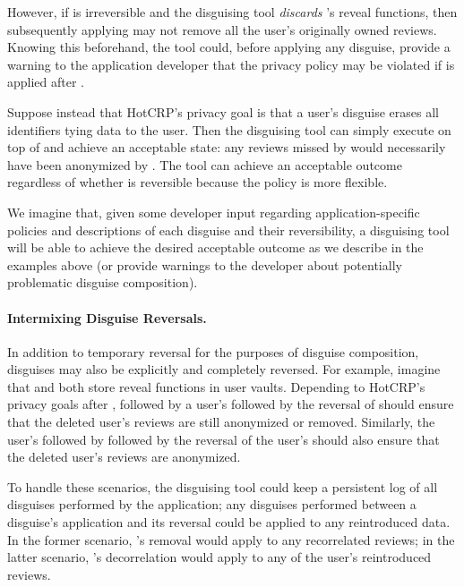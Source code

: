 However, if \ca is irreversible and the disguising tool \emph{discards} \ca's reveal functions, then
subsequently applying \gdpr may not remove all the user's originally owned reviews. Knowing this
beforehand, the tool could,
before applying any disguise, provide a warning to the application developer that the privacy policy may be violated if \gdpr is
applied after \ca.

Suppose instead that HotCRP's privacy goal is that a user's \gdpr disguise erases all identifiers
tying data to the user.
Then the disguising tool can simply execute \gdpr on top of
\ca and achieve an acceptable state: any reviews missed by \gdpr would necessarily have been
anonymized by \ca.  The tool can achieve an acceptable outcome regardless of whether \ca is
reversible because the policy is more flexible.

We imagine that, given some developer input regarding application-specific policies and descriptions
of each disguise and their reversibility, a disguising tool will be able to achieve the desired acceptable
outcome as we describe in the examples above (or provide warnings to the developer about potentially
problematic disguise composition).

\paragraph{Intermixing Disguise Reversals.}
In addition to temporary reversal for the purposes of disguise composition, disguises may also be
explicitly and completely reversed. 
For example, imagine that \ca and \gdpr both store reveal functions in user vaults. 
%
Depending to HotCRP's privacy goals after \gdpr, \ca followed by a user's \gdpr followed by the
reversal of \ca should ensure that the deleted user's reviews are still anonymized or removed.
Similarly, the user's \gdpr followed by \ca followed by the reversal of the user's \gdpr should also
ensure that the deleted user's reviews are anonymized.

To handle these scenarios, the disguising tool could keep a persistent log of all disguises
performed by the application; any disguises performed between a disguise's application and its
reversal could be applied to any reintroduced data. In the former scenario, \gdpr's removal would
apply to any recorrelated reviews; in the latter scenario, \ca's decorrelation would apply to any of
the user's reintroduced reviews.
